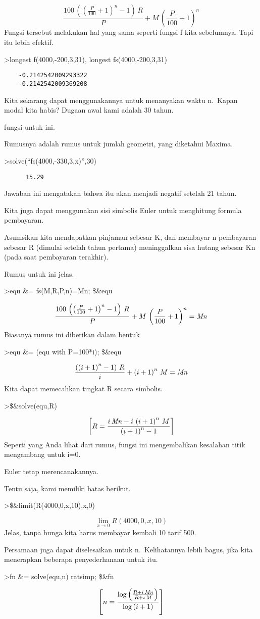 \documentclass[
]{book}
\begin{document}
\[\frac{100\,\left(\left(\frac{P}{100}+1\right)^{n}-1\right)\,R}{P}+M
 \,\left(\frac{P}{100}+1\right)^{n}\]Fungsi tersebut melakukan hal yang sama seperti fungsi f kita sebelumnya. Tapi itu lebih efektif.

\textgreater longest f(4000,-200,3,31), longest fs(4000,-200,3,31)

\begin{verbatim}
    -0.2142542009293322 
    -0.2142542009369208 
\end{verbatim}

Kita sekarang dapat menggunakannya untuk menanyakan waktu n.~Kapan modal kita habis? Dugaan awal kami adalah 30 tahun.

fungsi untuk ini.

Rumusnya adalah rumus untuk jumlah geometri, yang diketahui Maxima.

\textgreater solve(``fs(4000,-330,3,x)'',30)

\begin{verbatim}
      15.29 
\end{verbatim}

Jawaban ini mengatakan bahwa itu akan menjadi negatif setelah 21 tahun.

Kita juga dapat menggunakan sisi simbolis Euler untuk menghitung formula pembayaran.

Asumsikan kita mendapatkan pinjaman sebesar K, dan membayar n pembayaran sebesar R (dimulai setelah tahun pertama) meninggalkan sisa hutang sebesar Kn (pada saat pembayaran terakhir).

Rumus untuk ini jelas.

\textgreater equ \&= fs(M,R,P,n)=Mn; \$\&equ

\[\frac{100\,\left(\left(\frac{P}{100}+1\right)^{n}-1\right)\,R}{P}+M
 \,\left(\frac{P}{100}+1\right)^{n}={\it Mn}\]Biasanya rumus ini diberikan dalam bentuk

\textgreater equ \&= (equ with P=100*i); \$\&equ

\[\frac{\left(\left(i+1\right)^{n}-1\right)\,R}{i}+\left(i+1\right)^{
 n}\,M={\it Mn}\]Kita dapat memecahkan tingkat R secara simbolis.

\textgreater\$\&solve(equ,R)

\[\left[ R=\frac{i\,{\it Mn}-i\,\left(i+1\right)^{n}\,M}{\left(i+1
 \right)^{n}-1} \right] \]Seperti yang Anda lihat dari rumus, fungsi ini mengembalikan kesalahan titik mengambang untuk i=0.

Euler tetap merencanakannya.

Tentu saja, kami memiliki batas berikut.

\textgreater\$\&limit(R(4000,0,x,10),x,0)

\[\lim_{x\rightarrow 0}{R\left(4000 , 0 , x , 10\right)}\]Jelas, tanpa bunga kita harus membayar kembali 10 tarif 500.

Persamaan juga dapat diselesaikan untuk n.~Kelihatannya lebih bagus, jika kita menerapkan beberapa penyederhanaan untuk itu.

\textgreater fn \&= solve(equ,n) \textbar{} ratsimp; \$\&fn

\[\left[ n=\frac{\log \left(\frac{R+i\,{\it Mn}}{R+i\,M}\right)}{
 \log \left(i+1\right)} \right] \]

\backmatter
\end{document}
